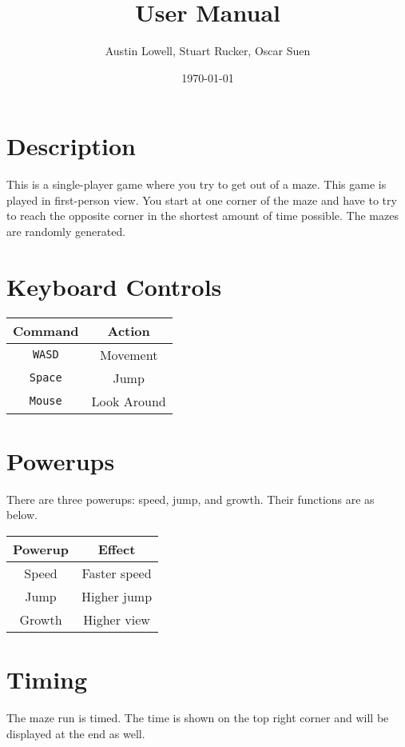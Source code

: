 \documentclass[12pt]{article}
\title{User Manual}
\author{Austin Lowell, Stuart Rucker, Oscar Suen}
\date{\today}
\begin{document}
\maketitle
\section{Description}
This is a single-player game where you try to get out of a maze.  This game is played in first-person view.  You start at one corner of the maze and have to try to reach the opposite corner in the shortest amount of time possible.  The mazes are randomly generated.

\section{Keyboard Controls}
\begin{tabular}{c | c}
Command & Action \\
\hline
\texttt{WASD} & Movement \\
\texttt{Space} & Jump \\
\texttt{Mouse} & Look Around
\end{tabular}

\section{Powerups}
There are three powerups: speed, jump, and growth.  Their functions are as below.

\begin{tabular}{c | c}
Powerup & Effect \\
\hline
Speed & Faster speed \\
Jump & Higher jump \\
Growth & Higher view
\end{tabular}

\section{Timing}
The maze run is timed.  The time is shown on the top right corner and will be displayed at the end as well.
\end{document}
